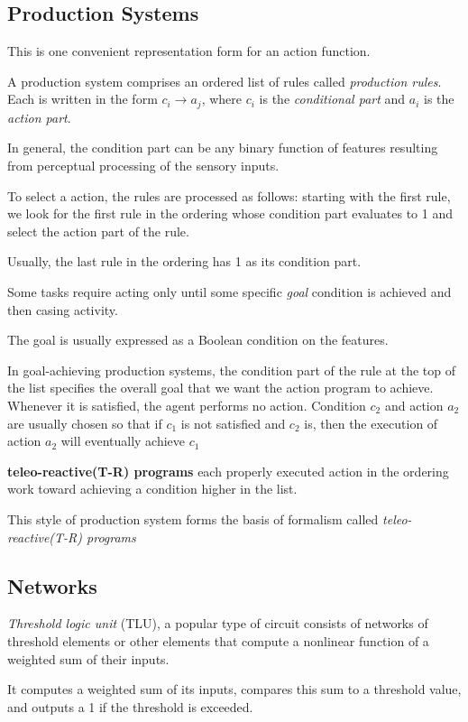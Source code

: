 \subsection{Production Systems}
This is one convenient representation form for an action function.

A production system comprises an ordered list of rules called \emph{production rules}. Each is written in the form $c_i\rightarrow a_j$, where $c_i$ is the \emph{conditional part} and $a_i$ is the \emph{action part}.

In general, the condition part can be any binary function of features resulting from perceptual processing of the sensory inputs.

To select a action, the rules are processed as follows: starting with the first rule, we look for the first rule in the ordering whose condition part evaluates to 1 and select the action part of the rule.

Usually, the last rule in the ordering has 1 as its condition part.

Some tasks require acting only until some specific \emph{goal} condition is achieved and then casing activity.

The goal is usually expressed as a Boolean condition on the features. 

In goal-achieving production systems, the condition part of the rule at the top of the list specifies the overall goal that we want the action program to achieve. Whenever it is satisfied, the agent performs no action. Condition $c_2$ and action $a_2$ are usually chosen so that if $c_1$ is not satisfied and $c_2$ is, then the execution of action $a_2$ will eventually achieve $c_1$

\textbf{teleo-reactive(T-R) programs} each properly executed action in the ordering work toward achieving a condition higher in the list.

This style of production system forms the basis of formalism called \emph{teleo-reactive(T-R) programs}
\subsection{Networks}
\emph{Threshold logic unit} (TLU), a popular type of circuit consists of networks of threshold elements or other elements that compute a nonlinear function of a weighted sum of their inputs.

It computes a weighted sum of its inputs, compares this sum to a threshold value, and outputs a 1 if the threshold is exceeded.

